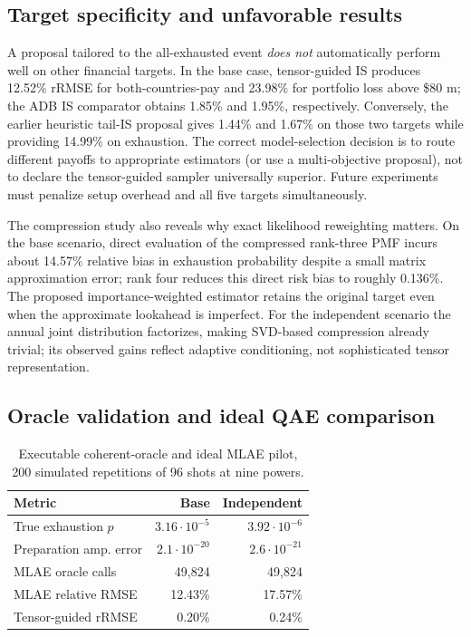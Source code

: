 \documentclass[10pt,conference]{IEEEtran}
\begin{document}
\subsection{Target specificity and unfavorable results}
A proposal tailored to the all-exhausted event \emph{does not} automatically perform well on other financial targets. In the base case, tensor-guided IS produces 12.52\% rRMSE for both-countries-pay and 23.98\% for portfolio loss above \$80 m; the ADB IS comparator obtains 1.85\% and 1.95\%, respectively. Conversely, the earlier heuristic tail-IS proposal gives 1.44\% and 1.67\% on those two targets while providing 14.99\% on exhaustion. The correct model-selection decision is to route different payoffs to appropriate estimators (or use a multi-objective proposal), not to declare the tensor-guided sampler universally superior. Future experiments must penalize setup overhead and all five targets simultaneously.

The compression study also reveals why exact likelihood reweighting matters. On the base scenario, direct evaluation of the compressed rank-three PMF incurs about 14.57\% relative bias in exhaustion probability despite a small matrix approximation error; rank four reduces this direct risk bias to roughly 0.136\%. The proposed importance-weighted estimator retains the original target even when the approximate lookahead is imperfect. For the independent scenario the annual joint distribution factorizes, making SVD-based compression already trivial; its observed gains reflect adaptive conditioning, not sophisticated tensor representation.

\subsection{Oracle validation and ideal QAE comparison}
\begin{table}[t]
\centering
\caption{Executable coherent-oracle and ideal MLAE pilot, 200 simulated repetitions of 96 shots at nine powers.}
\label{tab:quantum}
\scriptsize
\setlength{\tabcolsep}{3.5pt}
\begin{tabular}{@{}lrr@{}}
\toprule
Metric & Base & Independent \\
\midrule
True exhaustion $p$ & $3.16\cdot10^{-5}$ & $3.92\cdot10^{-6}$ \\
Preparation amp. error & $2.1\cdot10^{-20}$ & $2.6\cdot10^{-21}$ \\
MLAE oracle calls & 49,824 & 49,824 \\
MLAE relative RMSE & 12.43\% & 17.57\% \\
Tensor-guided rRMSE & 0.20\% & 0.24\% \\
\bottomrule
\end{tabular}
\end{table}
\end{document}

